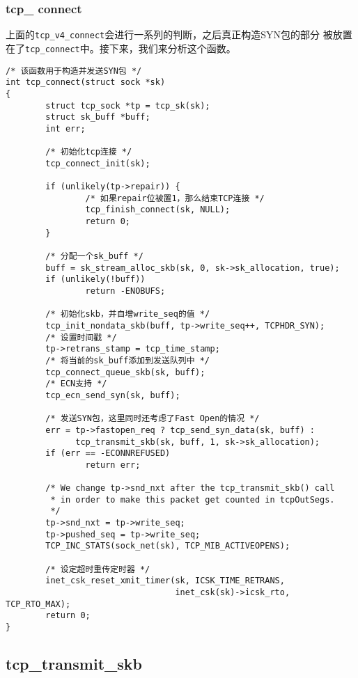 \subsubsection{tcp\_ connect}
上面的\texttt{tcp_v4_connect}会进行一系列的判断，之后真正构造SYN包的部分
被放置在了\texttt{tcp_connect}中。接下来，我们来分析这个函数。

\begin{verbatim}
/* 该函数用于构造并发送SYN包 */
int tcp_connect(struct sock *sk)
{
        struct tcp_sock *tp = tcp_sk(sk);
        struct sk_buff *buff;
        int err;

        /* 初始化tcp连接 */
        tcp_connect_init(sk);

        if (unlikely(tp->repair)) {
                /* 如果repair位被置1，那么结束TCP连接 */
                tcp_finish_connect(sk, NULL);
                return 0;
        }

        /* 分配一个sk_buff */
        buff = sk_stream_alloc_skb(sk, 0, sk->sk_allocation, true);
        if (unlikely(!buff))
                return -ENOBUFS;

        /* 初始化skb，并自增write_seq的值 */
        tcp_init_nondata_skb(buff, tp->write_seq++, TCPHDR_SYN);
        /* 设置时间戳 */
        tp->retrans_stamp = tcp_time_stamp;
        /* 将当前的sk_buff添加到发送队列中 */
        tcp_connect_queue_skb(sk, buff);
        /* ECN支持 */
        tcp_ecn_send_syn(sk, buff);

        /* 发送SYN包，这里同时还考虑了Fast Open的情况 */
        err = tp->fastopen_req ? tcp_send_syn_data(sk, buff) :
              tcp_transmit_skb(sk, buff, 1, sk->sk_allocation);
        if (err == -ECONNREFUSED)
                return err;

        /* We change tp->snd_nxt after the tcp_transmit_skb() call
         * in order to make this packet get counted in tcpOutSegs.
         */
        tp->snd_nxt = tp->write_seq;
        tp->pushed_seq = tp->write_seq;
        TCP_INC_STATS(sock_net(sk), TCP_MIB_ACTIVEOPENS);

        /* 设定超时重传定时器 */
        inet_csk_reset_xmit_timer(sk, ICSK_TIME_RETRANS,
                                  inet_csk(sk)->icsk_rto, TCP_RTO_MAX);
        return 0;
}
\end{verbatim}

\subsection{tcp\_transmit\_skb}

